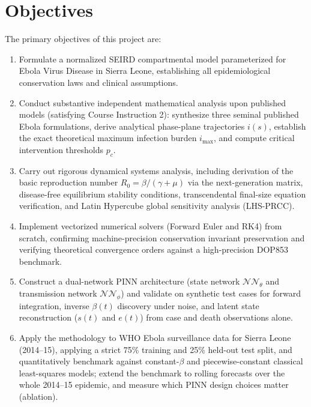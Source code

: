 \documentclass[11pt,a4paper]{article}
\begin{document}
\section{Objectives}
The primary objectives of this project are:
\begin{enumerate}
    \item Formulate a normalized SEIRD compartmental model parameterized for Ebola Virus Disease in Sierra Leone, establishing all epidemiological conservation laws and clinical assumptions.
    \item Conduct substantive independent mathematical analysis upon published models (satisfying Course Instruction 2): synthesize three seminal published Ebola formulations, derive analytical phase-plane trajectories $i(s)$, establish the exact theoretical maximum infection burden $i_{\max}$, and compute critical intervention thresholds $p_c$.
    \item Carry out rigorous dynamical systems analysis, including derivation of the basic reproduction number $R_0 = \beta/(\gamma+\mu)$ via the next-generation matrix, disease-free equilibrium stability conditions, transcendental final-size equation verification, and Latin Hypercube global sensitivity analysis (LHS-PRCC).
    \item Implement vectorized numerical solvers (Forward Euler and RK4) from scratch, confirming machine-precision conservation invariant preservation and verifying theoretical convergence orders against a high-precision DOP853 benchmark.
    \item Construct a dual-network PINN architecture (state network $\mathcal{NN}_\theta$ and transmission network $\mathcal{NN}_\phi$) and validate on synthetic test cases for forward integration, inverse $\beta(t)$ discovery under noise, and latent state reconstruction ($s(t)$ and $e(t)$) from case and death observations alone.
    \item Apply the methodology to WHO Ebola surveillance data for Sierra Leone (2014--15), applying a strict 75\% training and 25\% held-out test split, and quantitatively benchmark against constant-$\beta$ and piecewise-constant classical least-squares models; extend the benchmark to rolling forecasts over the whole 2014--15 epidemic, and measure which PINN design choices matter (ablation).
\end{enumerate}
\end{document}
